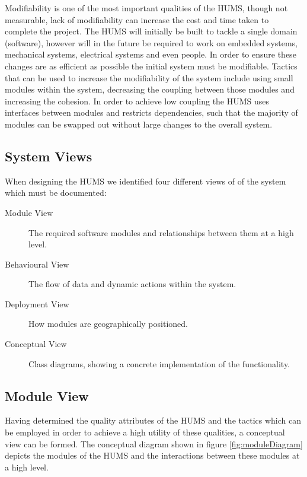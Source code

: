 \documentclass[10pt,a4paper]{article}
\begin{document}
Modifiability is one of the most important qualities of the HUMS, though not measurable, lack of modifiability can increase the cost and time taken to complete the project. The HUMS will initially be built to tackle a single domain (software), however will in the future be required to work on embedded systems, mechanical systems, electrical systems and even people. In order to ensure these changes are as efficient as possible the initial system 
must be modifiable. Tactics that can be used to increase the modifiability of the system include using small modules within the system, decreasing the coupling between those modules and increasing the cohesion. In order to achieve low coupling  the HUMS uses interfaces between modules and restricts dependencies, such that the majority of modules can be swapped out without large changes to the overall system.

\subsection{System Views}
When designing the HUMS we identified four different views of of the system which must be documented:
\begin{description}
\item[Module View] The required software modules and relationships between them at a high level.
\item[Behavioural View] The flow of data and dynamic actions within the system.
\item[Deployment View] How modules are geographically positioned.
\item[Conceptual View] Class diagrams, showing a concrete implementation of the functionality.
\end{description}

\subsection{Module View}
Having determined the quality attributes of the HUMS and the tactics which can be employed in order to achieve a high utility of these qualities, a conceptual view can be formed. The conceptual diagram shown in figure \ref{fig:moduleDiagram} depicts the modules of the HUMS and the interactions between these modules at a high level.
\end{document}
